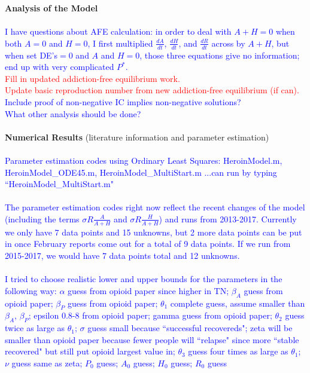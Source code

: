 \documentclass[12pt]{article}
\begin{document}


\textbf{Analysis of the Model} \\ \\
\textcolor{blue}{I have questions about AFE calculation: in order to deal with $A+H=0$ when both $A=0$ and $H=0$, I first multiplied $\frac{dA}{dt}$, $\frac{dH}{dt}$, and $\frac{dR}{dt}$ across by $A+H$, but when set DE's$=0$ and $A$ and $H =0$, those three equations give no information; end up with very complicated $P^*.$ } \\
\textcolor{red}{Fill in updated addiction-free equilibrium work.} \\
\textcolor{red}{Update basic reproduction number from new addiction-free equilibrium (if can).} \\  
\textcolor{blue}{Include proof of non-negative IC implies non-negative solutions?} \\ 
\textcolor{blue}{What other analysis should be done?} \\ \\
\textbf{Numerical Results} 
(literature information and parameter estimation) \\ \\
\textcolor{blue}{Parameter estimation codes using Ordinary Least Squares: HeroinModel.m, HeroinModel\_ODE45.m, HeroinModel\_MultiStart.m ...can run by typing ``HeroinModel\_MultiStart.m" \\ \\
The parameter estimation codes right now reflect the recent changes of the model (including the terms $\sigma R \frac{A}{A+H}$ and $\sigma R \frac{H}{A+H}$) and runs from 2013-2017. Currently we only have 7 data points and 15 unknowns, but 2 more data points can be put in once February reports come out for a total of 9 data points. If we run from 2015-2017, we would have 7 data points total and 12 unknowns. \\ \\
I tried to choose realistic lower and upper bounds for the parameters in the following way: $\alpha$ guess from opioid paper since higher in TN; $\beta_A $ guess from opioid paper; 
 $\beta_P$ guess from opioid paper; $\theta_1$ complete guess, assume smaller than $\beta_A$, $\beta_P$; 
 epsilon 0.8-8 from opioid paper; gamma guess from opioid paper; $\theta_2$
 guess twice as large as $\theta_1$; $\sigma$ guess small because
 ``successful recovereds"; zeta will be smaller than opioid paper because fewer people will ``relapse" since more ``stable recovered" but still
 put opioid largest value in; $\theta_3$ guess four times as large as
 $\theta_1$; $\nu$ guess same as zeta; $P_0$
 guess; $A_0$ guess; $H_0$ guess; $R_0$ guess} \\
\end{document}
